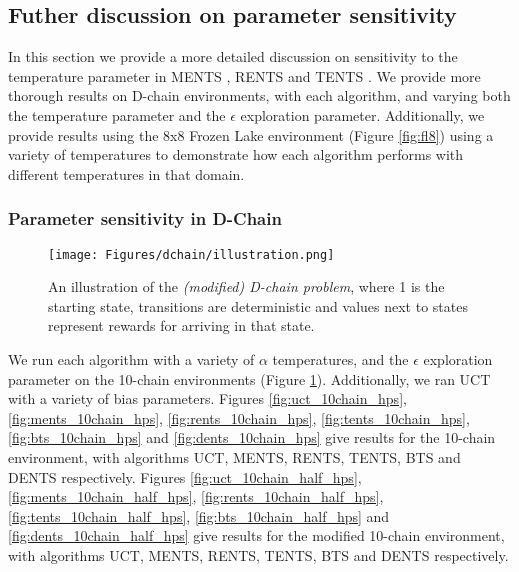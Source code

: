 \documentclass{article}
\theoremstyle{plain}
\begin{document}
\begin{appendices}
    

    
    \subsection{Futher discussion on parameter sensitivity} \label{app:param_sens}
        In this section we provide a more detailed discussion on sensitivity to the temperature parameter in MENTS \cite{xiao2019maximum}, RENTS and TENTS \cite{rents_your_tents}. We provide more thorough results on D-chain environments, with each algorithm, and varying both the temperature parameter and the $\epsilon$ exploration parameter. Additionally, we provide results using the 8x8 Frozen Lake environment (Figure \ref{fig:fl8}) using a variety of temperatures to demonstrate how each algorithm performs with different temperatures in that domain.


        \subsubsection{Parameter sensitivity in D-Chain} \label{app:param_sens_dchain}
            
            \begin{figure}
                \centering
                \texttt{[image: Figures/dchain/illustration.png]}
                \caption{An illustration of the \textit{(modified) D-chain problem}, where 1 is the starting state, transitions are deterministic and values next to states represent rewards for arriving in that state.}
                \label{fig:dchain_illustration_2}
            \end{figure}

            We run each algorithm with a variety of $\alpha$ temperatures, and the $\epsilon$ exploration parameter on the 10-chain environments (Figure \ref{fig:dchain_illustration_2}). Additionally, we ran UCT with a variety of bias parameters. Figures \ref{fig:uct_10chain_hps}, \ref{fig:ments_10chain_hps}, \ref{fig:rents_10chain_hps}, \ref{fig:tents_10chain_hps}, \ref{fig:bts_10chain_hps} and \ref{fig:dents_10chain_hps} give results for the 10-chain environment, with algorithms UCT, MENTS, RENTS, TENTS, BTS and DENTS respectively. Figures \ref{fig:uct_10chain_half_hps}, \ref{fig:ments_10chain_half_hps}, \ref{fig:rents_10chain_half_hps}, \ref{fig:tents_10chain_half_hps}, \ref{fig:bts_10chain_half_hps} and \ref{fig:dents_10chain_half_hps} give results for the modified 10-chain environment, with algorithms UCT, MENTS, RENTS, TENTS, BTS and DENTS respectively. 


\end{appendices}
\end{document}
